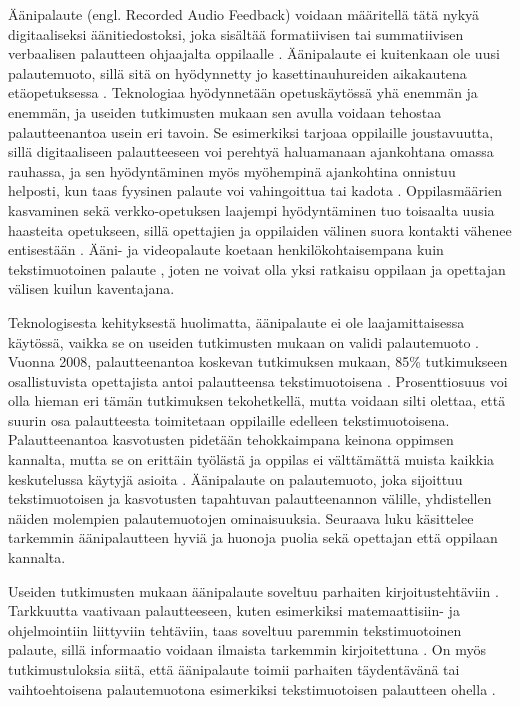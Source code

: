 \documentclass[utf8]{gradu3}
\begin{document}
Äänipalaute (engl. Recorded Audio Feedback) voidaan määritellä tätä nykyä digitaaliseksi äänitiedostoksi, joka sisältää formatiivisen tai summatiivisen verbaalisen palautteen ohjaajalta oppilaalle \parencite[][]{developing}. Äänipalaute ei kuitenkaan ole uusi palautemuoto, sillä sitä on hyödynnetty jo kasettinauhureiden aikakautena etäopetuksessa \parencite[][]{developing}. Teknologiaa hyödynnetään opetuskäytössä yhä enemmän ja enemmän, ja useiden tutkimusten mukaan sen avulla voidaan tehostaa palautteenantoa usein eri tavoin. Se esimerkiksi tarjoaa oppilaille joustavuutta, sillä digitaaliseen palautteeseen voi perehtyä haluamanaan ajankohtana omassa rauhassa, ja sen hyödyntäminen myös myöhempinä ajankohtina onnistuu helposti, kun taas fyysinen palaute voi vahingoittua tai kadota \parencite[][]{technology}. Oppilasmäärien kasvaminen sekä verkko-opetuksen laajempi hyödyntäminen tuo toisaalta uusia haasteita opetukseen, sillä opettajien ja oppilaiden välinen suora kontakti vähenee entisestään \parencite[][]{engaging}. Ääni- ja videopalaute koetaan henkilökohtaisempana kuin tekstimuotoinen palaute \parencite[][]{evaluating}, joten ne voivat olla yksi ratkaisu oppilaan ja opettajan välisen kuilun kaventajana.

Teknologisesta kehityksestä huolimatta, äänipalaute  ei ole laajamittaisessa käytössä, vaikka se on useiden tutkimusten mukaan on validi palautemuoto \parencite[][]{engaging}. Vuonna 2008, palautteenantoa koskevan tutkimuksen mukaan, 85\% tutkimukseen osallistuvista opettajista antoi palautteensa tekstimuotoisena \parencite[][]{electronic}. Prosenttiosuus voi olla hieman eri tämän tutkimuksen tekohetkellä, mutta voidaan silti olettaa, että suurin osa palautteesta toimitetaan oppilaille edelleen tekstimuotoisena. Palautteenantoa kasvotusten pidetään tehokkaimpana keinona oppimsen kannalta, mutta se on erittäin työlästä ja oppilas ei välttämättä muista kaikkia keskutelussa käytyjä asioita \parencite[][]{modes}. Äänipalaute on palautemuoto, joka sijoittuu tekstimuotoisen ja kasvotusten tapahtuvan palautteenannon välille, yhdistellen näiden molempien palautemuotojen ominaisuuksia. Seuraava luku käsittelee tarkemmin äänipalautteen hyviä ja huonoja puolia sekä opettajan että oppilaan kannalta.

Useiden tutkimusten mukaan äänipalaute soveltuu parhaiten kirjoitustehtäviin \parencite[][]{academics, enganing, using}. Tarkkuutta vaativaan palautteeseen, kuten esimerkiksi matemaattisiin- ja ohjelmointiin liittyviin tehtäviin, taas soveltuu paremmin tekstimuotoinen palaute, sillä informaatio voidaan ilmaista tarkemmin kirjoitettuna \parencite[][]{academics}.   On myös tutkimustuloksia siitä, että äänipalaute toimii parhaiten täydentävänä  tai vaihtoehtoisena palautemuotona esimerkiksi tekstimuotoisen palautteen ohella \parencite[][]{academics, }.
\end{document}
